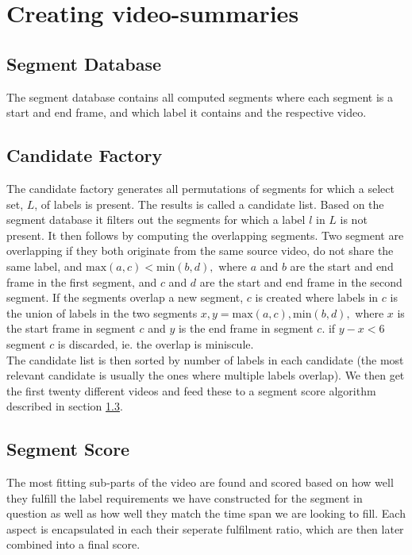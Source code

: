 %
\section{Creating video-summaries}
%

%
\subsection{Segment Database}
%
The segment database contains all computed segments where each segment is a start and end frame, and which label it contains and the respective video.
%
\subsection{Candidate Factory}
%
The candidate factory generates all permutations of segments for which a select set, $L$, of labels is present. The results is called a candidate list. Based on the segment database it filters out
the segments for which a label $l$ in $L$ is not present. It then follows by computing the overlapping segments. Two segment are overlapping if they both originate from the same source video, do not share the same label, and $\text{max}(a, c) < \text{min}(b, d),$ where $a$ and $b$ are the start and end frame in the first segment, and $c$ and $d$ are the start and end frame in the second segment. If the segments overlap a new segment, $c$ is created where labels in $c$ is the union of labels in the two segments $x,y = \text{max}(a, c), \text{min}(b, d),$ where $x$ is the start frame in segment $c$ and $y$ is the end frame in segment $c$. if $y-x < 6$ segment $c$ is discarded, ie. the overlap is miniscule.\\
The candidate list is then sorted by number of labels in each candidate (the most relevant candidate is usually the ones where multiple labels overlap). We then get the first twenty different videos and feed these to a segment score algorithm described in section \ref{sec:segment_score}.
%
\subsection{Segment Score}\label{sec:segment_score}
%
%
The most fitting sub-parts of the video are found and scored based on how well they fulfill the label requirements we have constructed for the segment in question as well as how well they match the time span we are looking to fill. Each aspect is encapsulated in each their seperate fulfilment ratio, which are then later combined into a final score.
%
%
%
